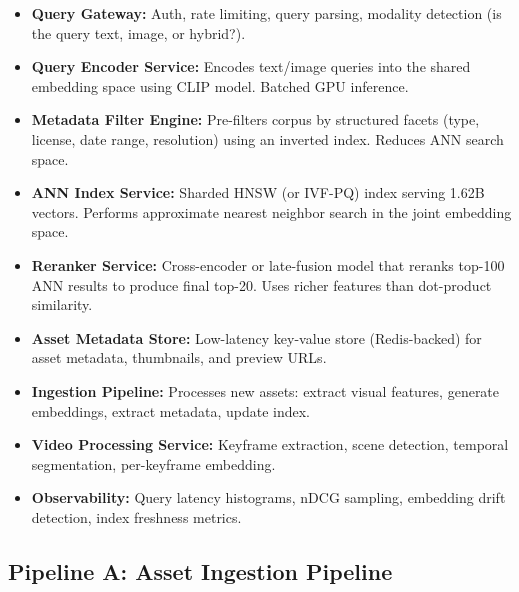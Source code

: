 \begin{itemize}
  \item \textbf{Query Gateway:} Auth, rate limiting, query parsing, modality detection (is the query text, image, or hybrid?).
  \item \textbf{Query Encoder Service:} Encodes text/image queries into the shared embedding space using CLIP model. Batched GPU inference.
  \item \textbf{Metadata Filter Engine:} Pre-filters corpus by structured facets (type, license, date range, resolution) using an inverted index. Reduces ANN search space.
  \item \textbf{ANN Index Service:} Sharded HNSW (or IVF-PQ) index serving 1.62B vectors. Performs approximate nearest neighbor search in the joint embedding space.
  \item \textbf{Reranker Service:} Cross-encoder or late-fusion model that reranks top-100 ANN results to produce final top-20. Uses richer features than dot-product similarity.
  \item \textbf{Asset Metadata Store:} Low-latency key-value store (Redis-backed) for asset metadata, thumbnails, and preview URLs.
  \item \textbf{Ingestion Pipeline:} Processes new assets: extract visual features, generate embeddings, extract metadata, update index.
  \item \textbf{Video Processing Service:} Keyframe extraction, scene detection, temporal segmentation, per-keyframe embedding.
  \item \textbf{Observability:} Query latency histograms, nDCG sampling, embedding drift detection, index freshness metrics.
\end{itemize}

\subsection*{Pipeline A: Asset Ingestion Pipeline}

